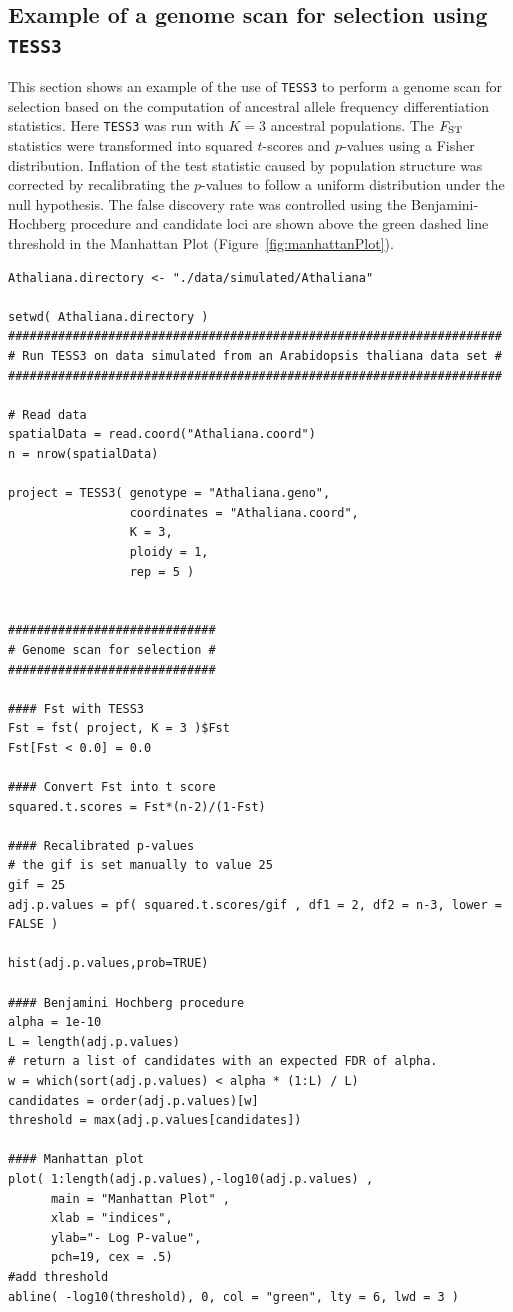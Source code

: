 \documentclass[10pt,a4paper]{article}
\begin{document}
\subsection{Example of a genome scan for selection using {\tt TESS3}}\label{sec:sel}
This section shows an example of the use of {\tt TESS3} to perform a genome scan for selection based on the computation of ancestral allele frequency differentiation statistics. Here {\tt TESS3} was run with $K = 3$ ancestral populations. The $F_{\rm ST}$ statistics were transformed into squared $t$-scores and $p$-values using a Fisher distribution. Inflation of the test statistic caused by population structure was corrected by recalibrating the $p$-values to follow a uniform distribution under the null hypothesis. The false discovery rate was controlled using the Benjamini-Hochberg procedure and candidate loci are shown above the green dashed line threshold in the Manhattan Plot (Figure~\ref{fig:manhattanPlot}).


\newpage

\begin{Verbatim}[frame=single]
Athaliana.directory <- "./data/simulated/Athaliana"

setwd( Athaliana.directory )
#####################################################################
# Run TESS3 on data simulated from an Arabidopsis thaliana data set #
#####################################################################

# Read data
spatialData = read.coord("Athaliana.coord")
n = nrow(spatialData)

project = TESS3( genotype = "Athaliana.geno", 
                 coordinates = "Athaliana.coord", 
                 K = 3, 
                 ploidy = 1, 
                 rep = 5 )


#############################
# Genome scan for selection #
#############################

#### Fst with TESS3 
Fst = fst( project, K = 3 )$Fst
Fst[Fst < 0.0] = 0.0

#### Convert Fst into t score
squared.t.scores = Fst*(n-2)/(1-Fst)

#### Recalibrated p-values
# the gif is set manually to value 25
gif = 25
adj.p.values = pf( squared.t.scores/gif , df1 = 2, df2 = n-3, lower = FALSE )

hist(adj.p.values,prob=TRUE)

#### Benjamini Hochberg procedure
alpha = 1e-10
L = length(adj.p.values)
# return a list of candidates with an expected FDR of alpha.
w = which(sort(adj.p.values) < alpha * (1:L) / L)
candidates = order(adj.p.values)[w]
threshold = max(adj.p.values[candidates])

#### Manhattan plot 
plot( 1:length(adj.p.values),-log10(adj.p.values) , 
      main = "Manhattan Plot" , 
      xlab = "indices", 
      ylab="- Log P-value", 
      pch=19, cex = .5) 
#add threshold
abline( -log10(threshold), 0, col = "green", lty = 6, lwd = 3 )
\end{Verbatim}
\end{document}

